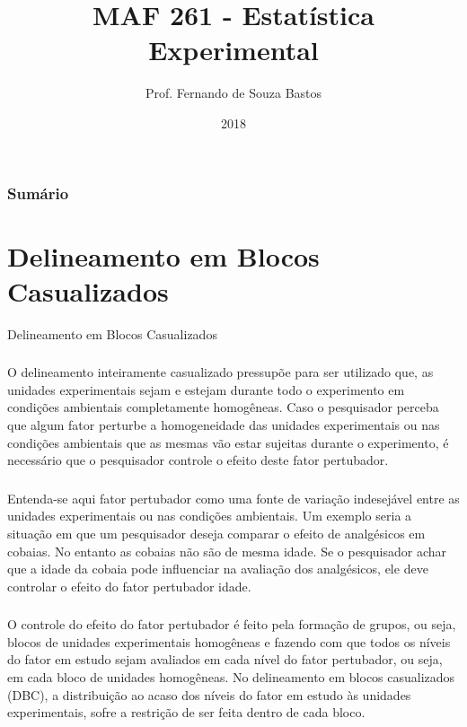 \documentclass[14pt,aspectratio=1610]{beamer}
\title{MAF 261 - Estatística Experimental}
\author{Prof. Fernando de Souza Bastos}
\institute{Instituto de Ciências Exatas e Tecnológicas\texorpdfstring{\\ Universidade Federal de Viçosa}{}\texorpdfstring{\\ Campus UFV - Florestal}{}}
\date{2018}
\begin{document}


\frame{\titlepage}

\begin{frame}{}
\frametitle{\bf Sumário}
\tableofcontents
\end{frame}

\section{Delineamento em Blocos Casualizados}
\begin{frame}{Delineamento em Blocos Casualizados}
\frametitle{}
\begin{block}{}
\justifying
O delineamento inteiramente casualizado pressupõe para ser utilizado que, as
unidades experimentais sejam e estejam durante todo o experimento em condições
ambientais completamente homogêneas. Caso o pesquisador perceba que algum fator
perturbe a homogeneidade das unidades experimentais ou nas condições ambientais que
as mesmas vão estar sujeitas durante o experimento, é necessário que o pesquisador
controle o efeito deste fator pertubador.

\end{block}
\end{frame}

\begin{frame}{}
\frametitle{}
\begin{block}{}
\justifying
Entenda-se aqui fator pertubador como uma fonte de variação indesejável entre as unidades experimentais ou nas condições ambientais. Um exemplo seria a situação em que um pesquisador deseja comparar o efeito de analgésicos em cobaias. No entanto as cobaias não são de mesma idade. Se o pesquisador achar que a idade da cobaia pode influenciar na avaliação dos analgésicos, ele deve controlar o efeito do fator pertubador idade.
\end{block}
\end{frame}

\begin{frame}{}
\frametitle{}
\begin{block}{}
\justifying
O controle do efeito do fator pertubador é feito pela formação de grupos, ou seja,
blocos de unidades experimentais homogêneas e fazendo com que todos os níveis do
fator em estudo sejam avaliados em cada nível do fator pertubador, ou seja, em cada
bloco de unidades homogêneas. No delineamento em blocos casualizados (DBC), a
distribuição ao acaso dos níveis do fator em estudo às unidades experimentais, sofre a restrição de ser feita dentro de cada bloco.
\end{block}
\end{frame}
\end{document}
